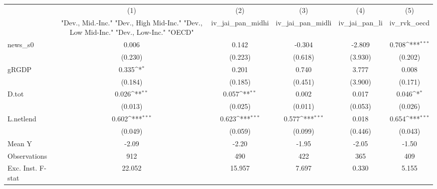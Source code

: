 {
\def\sym#1{\ifmmode^{#1}\else\(^{#1}\)\fi}
\begin{tabular}{l*{5}{c}}
\toprule
            &\multicolumn{1}{c}{(1)}&\multicolumn{1}{c}{(2)}&\multicolumn{1}{c}{(3)}&\multicolumn{1}{c}{(4)}&\multicolumn{1}{c}{(5)}\\
            &\multicolumn{1}{c}{ "Dev., Mid.-Inc." "Dev., High Mid-Inc." "Dev., Low Mid-Inc." "Dev., Low-Inc." "OECD" }&\multicolumn{1}{c}{iv\_jai\_pan\_midhi}&\multicolumn{1}{c}{iv\_jai\_pan\_midli}&\multicolumn{1}{c}{iv\_jai\_pan\_li}&\multicolumn{1}{c}{iv\_rvk\_oecd}\\
\midrule
news\_s0     &       0.006         &       0.142         &      -0.304         &      -2.809         &       0.708\sym{***}\\
            &     (0.230)         &     (0.223)         &     (0.618)         &     (3.930)         &     (0.202)         \\
\addlinespace
gRGDP       &       0.335\sym{*}  &       0.201         &       0.740         &       3.777         &       0.008         \\
            &     (0.184)         &     (0.185)         &     (0.451)         &     (3.900)         &     (0.171)         \\
\addlinespace
D.tot       &       0.026\sym{**} &       0.057\sym{**} &       0.002         &       0.017         &       0.046\sym{*}  \\
            &     (0.013)         &     (0.025)         &     (0.011)         &     (0.053)         &     (0.026)         \\
\addlinespace
L.netlend   &       0.602\sym{***}&       0.623\sym{***}&       0.577\sym{***}&       0.018         &       0.654\sym{***}\\
            &     (0.049)         &     (0.059)         &     (0.099)         &     (0.446)         &     (0.043)         \\
\midrule
Mean Y      &       -2.09         &       -2.20         &       -1.95         &       -2.05         &       -1.50         \\
Observations&         912         &         490         &         422         &         365         &         409         \\
Exc. Inst. F-stat&      22.052         &      15.957         &       7.697         &       0.330         &       5.155         \\
\bottomrule
\end{tabular}
}

